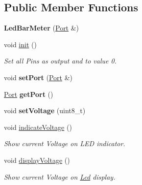 \subsection*{Public Member Functions}
\begin{DoxyCompactItemize}
\item 
\mbox{\label{class_led_bar_meter_ab0eb3641260b041a2b207754a0568716}} 
{\bfseries Led\+Bar\+Meter} (\mbox{\hyperlink{class_port}{Port}} \&)
\item 
\mbox{\label{class_led_bar_meter_a8b5e3d87127c2768391dd6e10070be6e}} 
void \mbox{\hyperlink{class_led_bar_meter_a8b5e3d87127c2768391dd6e10070be6e}{init}} ()
\begin{DoxyCompactList}\small\item\em Set all Pins as output and to value 0. \end{DoxyCompactList}\item 
\mbox{\label{class_led_bar_meter_a54f309be192b51e2cf4b5c7443a4d0f3}} 
void {\bfseries set\+Port} (\mbox{\hyperlink{class_port}{Port}} \&)
\item 
\mbox{\label{class_led_bar_meter_a84c4eafe45db4abd050d528e9cc49108}} 
\mbox{\hyperlink{class_port}{Port}} {\bfseries get\+Port} ()
\item 
\mbox{\label{class_led_bar_meter_aee8b0685c3eb9b624a835e2fc800bdae}} 
void {\bfseries set\+Voltage} (uint8\+\_\+t)
\item 
\mbox{\label{class_led_bar_meter_a0c03c62888de6aee1825e1f3a67add37}} 
void \mbox{\hyperlink{class_led_bar_meter_a0c03c62888de6aee1825e1f3a67add37}{indicate\+Voltage}} ()
\begin{DoxyCompactList}\small\item\em Show current Voltage on L\+ED indicator. \end{DoxyCompactList}\item 
\mbox{\label{class_led_bar_meter_aec7be14977443321bfdc29318e74b003}} 
void \mbox{\hyperlink{class_led_bar_meter_aec7be14977443321bfdc29318e74b003}{display\+Voltage}} ()
\begin{DoxyCompactList}\small\item\em Show current Voltage on \mbox{\hyperlink{class_lcd}{Lcd}} display. \end{DoxyCompactList}\end{DoxyCompactItemize}


